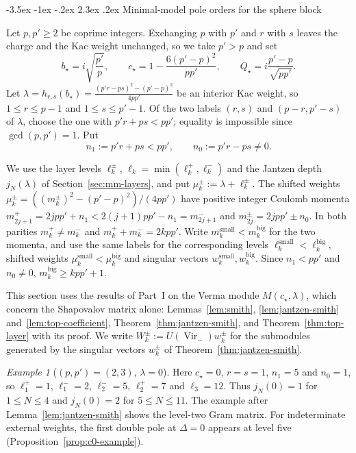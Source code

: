 \documentclass[twoside,10pt]{article}
\makeatletter
\numberwithin{equation}{section}
\theoremstyle{slbody}
\theoremstyle{definition}
\theoremstyle{remark}
\newtheorem*{example*}{Example}
\newcommand{\Vir}{\operatorname{Vir}}
\renewcommand{\section}{%
  \@startsection{section}{1}{\z@}%
    {-3.5ex \@plus -1ex \@minus -.2ex}%
    {2.3ex \@plus .2ex}%
    {\normalfont\large\bfseries}}
\makeatother
\begin{document}
\section{Minimal-model pole orders for the sphere block}\label{sec:jantzen}

Let \(p,p'\geq2\) be coprime integers.  Exchanging \(p\) with \(p'\) and \(r\)
with \(s\) leaves the charge and the Kac weight unchanged, so we take
\(p'>p\) and set
\[
 b_\star=i\sqrt{\frac{p'}{p}},\qquad
 c_\star=1-\frac{6(p'-p)^2}{pp'},\qquad
 Q_\star=i\frac{p'-p}{\sqrt{pp'}}.
\]
Let \(\lambda=h_{r,s}(b_\star)=\frac{(p'r-ps)^2-(p'-p)^2}{4pp'}\) be an
interior Kac weight, so \(1\leq r\leq p-1\) and \(1\leq s\leq p'-1\).  Of the
two labels \((r,s)\) and \((p-r,p'-s)\) of \(\lambda\), choose the one with
\(p'r+ps<pp'\); equality is impossible since \(\gcd(p,p')=1\).  Put
\[
 n_1:=p'r+ps<pp',\qquad n_0:=p'r-ps\neq0.
\]

We use the layer levels \(\ell^\pm_k\), \(\ell_k=\min(\ell^+_k,\ell^-_k)\)
and the Jantzen depth \(j_N(\lambda)\) of Section~\ref{sec:mm-layers}, and put
\(\mu^\pm_k:=\lambda+\ell^\pm_k\).
The shifted weights \(\mu^\pm_k=((m^\pm_k)^2-(p'-p)^2)/(4pp')\) have
positive integer Coulomb momenta
\(m^+_{2j+1}=2jpp'+n_1<2(j+1)pp'-n_1=m^-_{2j+1}\) and
\(m^\pm_{2j}=2jpp'\pm n_0\).  In both parities \(m^+_k\neq m^-_k\) and
\(m^+_k+m^-_k=2kpp'\).  Write \(m^{\mathrm{small}}_k<m^{\mathrm{big}}_k\) for
the two momenta, and use the same labels for the corresponding levels
\(\ell^{\mathrm{small}}_k<\ell^{\mathrm{big}}_k\), shifted weights
\(\mu^{\mathrm{small}}_k<\mu^{\mathrm{big}}_k\) and singular vectors
\(w^{\mathrm{small}}_k,w^{\mathrm{big}}_k\).  Since \(n_1<pp'\) and
\(n_0\neq0\), \(m^{\mathrm{big}}_k\geq kpp'+1\).

This section uses the results of Part~I on the Verma module
\(M(c_\star,\lambda)\), which concern the Shapovalov matrix alone:
Lemmas~\ref{lem:smith}, \ref{lem:jantzen-smith} and~\ref{lem:top-coefficient},
Theorem~\ref{thm:jantzen-smith}, and Theorem~\ref{thm:top-layer} with its
proof.  We write \(W^\pm_k:=U(\Vir_-)w^\pm_k\) for the submodules generated by
the singular vectors \(w^\pm_k\) of Theorem~\ref{thm:jantzen-smith}.

\begin{example*}[\((p,p')=(2,3)\), \(\lambda=0\)]
Here \(c_\star=0\), \(r=s=1\), \(n_1=5\) and \(n_0=1\), so \(\ell^+_1=1\),
\(\ell^-_1=2\), \(\ell^-_2=5\), \(\ell^+_2=7\) and \(\ell_3=12\).  Thus
\(j_N(0)=1\) for \(1\leq N\leq4\) and \(j_N(0)=2\) for \(5\leq N\leq11\).  The
example after Lemma~\ref{lem:jantzen-smith} shows the level-two Gram matrix.
For indeterminate external weights, the first double pole at \(\Delta=0\)
appears at level five (Proposition~\ref{prop:c0-example}).
\end{example*}
\end{document}
